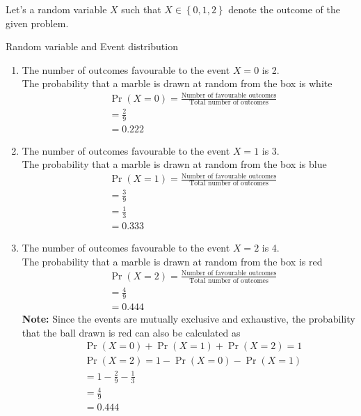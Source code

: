 \documentclass[journal,12pt,twocolumn]{IEEEtran}
\providecommand{\pr}[1]{\ensuremath{\Pr\left(#1\right)}}
\providecommand{\cbrak}[1]{\ensuremath{\left\{#1\right\}}}
\newcommand{\note}{\noindent \textbf{Note: }}
\begin{document}
Let's a random variable $X$ such that $X\in \cbrak{0,1,2}$ denote the outcome of the given problem. 
\begin{table}[H]

	\caption{Random variable and Event distribution}
	\label{tab1}
\end{table}
\begin{enumerate}[label=(\roman{enumi})]
      \item The number of outcomes favourable to the event $X=0$ is 2.\\
      The probability that a marble is drawn at random from the box is white
\begin{align}
	 &\pr{X=0} = \frac{\text{Number of favourable outcomes}}{\text{Total number of outcomes}}\\
	 &=\frac{2}{9}\\
	 &=0.222
\end{align}
      \item The number of outcomes favourable to the event $X=1$ is 3.\\ 
      The probability that a marble is drawn at random from the box is blue
\begin{align}
	 &\pr{X=1} = \frac{\text{Number of favourable outcomes}}{\text{Total number of outcomes}}\\
	 &=\frac{3}{9}\\
	 &=\frac{1}{3}\\
	 &=0.333
\end{align}
      \item The number of outcomes favourable to the event $X=2$ is 4.\\
      The probability that a marble is drawn at random from the box is red
\begin{align}
	 &\pr{X=2} = \frac{\text{Number of favourable outcomes}}{\text{Total number of outcomes}}\\
	 &=\frac{4}{9}\\
	 &=0.444
\end{align}
\note  Since the events are mutually exclusive and exhaustive, the probability that the ball drawn is red can also be calculated as
\begin{align}
	&\pr{X=0}+\pr{X=1}+\pr{X=2}=1\\
    &\pr{X=2}=1-\pr{X=0}-\pr{X=1}\\
    &= 1-\frac{2}{9}-\frac{1}{3}\\
    &=\frac{4}{9}\\
    &=0.444
    \end{align}
\end{enumerate}
\end{document}
